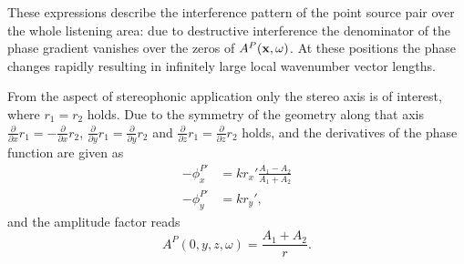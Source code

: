 These expressions describe the interference pattern of the point source pair over the whole listening area: 
due to destructive interference the denominator of the phase gradient vanishes over the zeros of $A^P(\mathbf{x},\omega)$.
At these positions the phase changes rapidly resulting in infinitely large local wavenumber vector lengths.

From the aspect of stereophonic application only the stereo axis is of interest, where $r_1 = r_2$ holds.
Due to the symmetry of the geometry along that axis $\frac{\partial}{\partial x} r_1 = - \frac{\partial}{\partial x} r_2$, $\frac{\partial}{\partial y} r_1 = \frac{\partial}{\partial y} r_2$ and $\frac{\partial}{\partial z} r_1 = \frac{\partial}{\partial z} r_2$ holds, and the derivatives of the phase function are given as
\begin{align}
-\phi^{P'}_x &= k r_x' \frac{ A_1  - A_2 
 }{ A_1 + A_2} \\
-\phi^{P'}_y &= k r_y',
\end{align}
and the amplitude factor reads
\begin{equation}
A^P(0,y,z,\omega) = \frac{A_1 +  A_2}{r}.
\label{Eq:AppB:stereo_amplitude}
\end{equation}